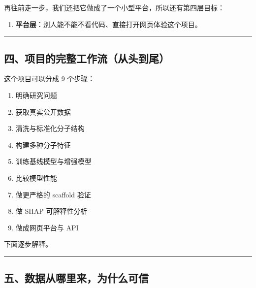 \documentclass[
  ,
]{ctexart}
\providecommand{\tightlist}{%
  \setlength{\itemsep}{0pt}\setlength{\parskip}{0pt}}
\begin{document}
再往前走一步，我们还把它做成了一个小型平台，所以还有第四层目标：

\begin{enumerate}
\def\labelenumi{\arabic{enumi}.}
\setcounter{enumi}{3}
\tightlist
\item
  \textbf{平台层}：别人能不能不看代码、直接打开网页体验这个项目。
\end{enumerate}

\begin{center}\rule{0.5\linewidth}{0.5pt}\end{center}

\hypertarget{ux56dbux9879ux76eeux7684ux5b8cux6574ux5de5ux4f5cux6d41ux4eceux5934ux5230ux5c3e}{%
\subsection{四、项目的完整工作流（从头到尾）}\label{ux56dbux9879ux76eeux7684ux5b8cux6574ux5de5ux4f5cux6d41ux4eceux5934ux5230ux5c3e}}

这个项目可以分成 9 个步骤：

\begin{enumerate}
\def\labelenumi{\arabic{enumi}.}
\tightlist
\item
  明确研究问题\\
\item
  获取真实公开数据\\
\item
  清洗与标准化分子结构\\
\item
  构建多种分子特征\\
\item
  训练基线模型与增强模型\\
\item
  比较模型性能\\
\item
  做更严格的 scaffold 验证\\
\item
  做 SHAP 可解释性分析\\
\item
  做成网页平台与 API
\end{enumerate}

下面逐步解释。

\begin{center}\rule{0.5\linewidth}{0.5pt}\end{center}

\hypertarget{ux4e94ux6570ux636eux4eceux54eaux91ccux6765ux4e3aux4ec0ux4e48ux53efux4fe1}{%
\subsection{五、数据从哪里来，为什么可信}\label{ux4e94ux6570ux636eux4eceux54eaux91ccux6765ux4e3aux4ec0ux4e48ux53efux4fe1}}
\end{document}

